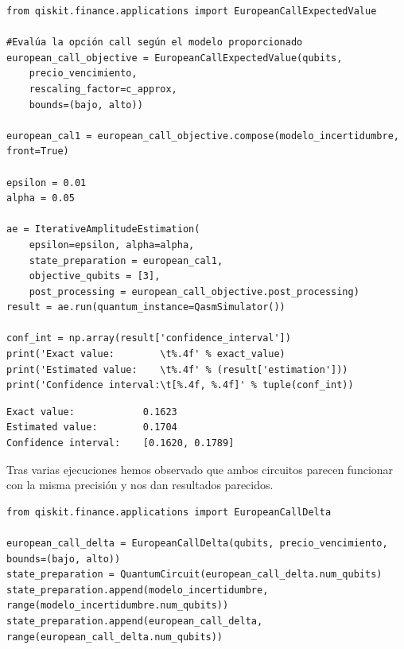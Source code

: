 \begin{verbatim}
from qiskit.finance.applications import EuropeanCallExpectedValue

#Evalúa la opción call según el modelo proporcionado
european_call_objective = EuropeanCallExpectedValue(qubits,
    precio_vencimiento,
    rescaling_factor=c_approx,
    bounds=(bajo, alto))

european_cal1 = european_call_objective.compose(modelo_incertidumbre, front=True)

epsilon = 0.01
alpha = 0.05

ae = IterativeAmplitudeEstimation(
    epsilon=epsilon, alpha=alpha,
    state_preparation = european_cal1,
    objective_qubits = [3],
    post_processing = european_call_objective.post_processing)
result = ae.run(quantum_instance=QasmSimulator())

conf_int = np.array(result['confidence_interval'])
print('Exact value:        \t%.4f' % exact_value)
print('Estimated value:    \t%.4f' % (result['estimation']))
print('Confidence interval:\t[%.4f, %.4f]' % tuple(conf_int))
\end{verbatim}

\begin{resultado}
\begin{verbatim}
Exact value:        	0.1623
Estimated value:    	0.1704
Confidence interval:	[0.1620, 0.1789]
\end{verbatim}
\end{resultado}

Tras varias ejecuciones hemos observado que ambos circuitos parecen funcionar con la misma precisión y nos dan resultados parecidos.

\begin{verbatim}
from qiskit.finance.applications import EuropeanCallDelta

european_call_delta = EuropeanCallDelta(qubits, precio_vencimiento, bounds=(bajo, alto))
state_preparation = QuantumCircuit(european_call_delta.num_qubits)
state_preparation.append(modelo_incertidumbre, range(modelo_incertidumbre.num_qubits))
state_preparation.append(european_call_delta, range(european_call_delta.num_qubits))
\end{verbatim}

